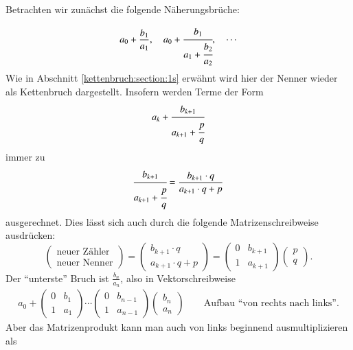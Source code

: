 Betrachten wir zunächst die folgende Näherungsbrüche:

\begin{align*}
a_0 + \frac{b_1}{a_1},
\quad
a_0 + \cfrac{b_1}{a_1 + \cfrac{b_2}{a_2}},
\quad
\cdots
\end{align*}
Wie in Abschnitt \ref{kettenbruch:section:1s} erwähnt wird hier der Nenner wieder als Kettenbruch dargestellt.
Insofern  werden Terme der Form
\begin{align*}
a_k + \cfrac{b_{k + 1}}{a_{k + 1} + \cfrac{p}{q}}
\end{align*}
immer zu
\begin{align*}
\cfrac{b_{k+1}}{a_{k+1} + \cfrac{p}{q}} = \frac{b_{k+1} \cdot q}{a_{k+1} \cdot q + p}
\end{align*}
ausgerechnet.
Dies lässt sich auch durch die folgende Matrizenschreibweise ausdrücken:
\begin{equation}
		\begin{pmatrix}
			\textrm{neuer Zähler}\\
			\textrm{neuer Nenner}
		\end{pmatrix}
 = 		\begin{pmatrix}
			b_{k+1} \cdot q\\
			a_{k+1} \cdot q + p
		\end{pmatrix}
		=\begin{pmatrix}
			0&	b_{k+1}\\
			1&	a_{k+1}
		\end{pmatrix}
		\begin{pmatrix}
		p \\
		q
		\end{pmatrix}.
\label{kettenbruch:section:Rekursionsformel}
\end{equation}
Der ``unterste'' Bruch ist $\frac{b_n}{a_n}$, also in Vektorschreibweise
\begin{align*}
a_0 + 	\begin{pmatrix}
			0& b_1\\
			1& a_1
		\end{pmatrix}
		\cdots
		\begin{pmatrix}
			0& b_{n-1}\\
			1& a_{n-1}
		\end{pmatrix}
		\begin{pmatrix}
			b_n\\
			a_n
		\end{pmatrix}
\qquad\textrm{Aufbau ``von rechts nach links''.}
\end{align*}
Aber das Matrizenprodukt kann man auch von links beginnend ausmultiplizieren als
